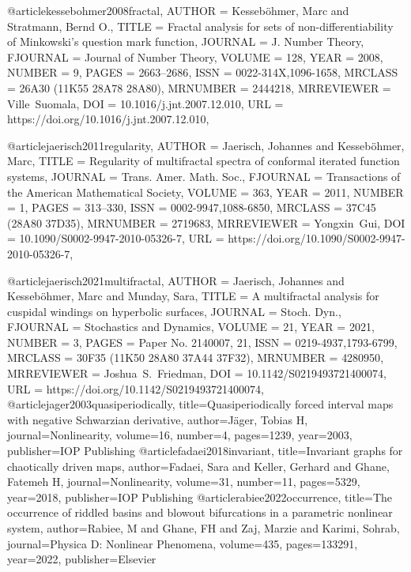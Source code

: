 @article{kessebohmer2008fractal,
    AUTHOR = {Kesseb\"ohmer, Marc and Stratmann, Bernd O.},
     TITLE = {Fractal analysis for sets of non-differentiability of
              {M}inkowski's question mark function},
   JOURNAL = {J. Number Theory},
  FJOURNAL = {Journal of Number Theory},
    VOLUME = {128},
      YEAR = {2008},
    NUMBER = {9},
     PAGES = {2663--2686},
      ISSN = {0022-314X,1096-1658},
   MRCLASS = {26A30 (11K55 28A78 28A80)},
  MRNUMBER = {2444218},
MRREVIEWER = {Ville\ Suomala},
       DOI = {10.1016/j.jnt.2007.12.010},
       URL = {https://doi.org/10.1016/j.jnt.2007.12.010},
}

@article{jaerisch2011regularity,
    AUTHOR = {Jaerisch, Johannes and Kesseb\"ohmer, Marc},
     TITLE = {Regularity of multifractal spectra of conformal iterated
              function systems},
   JOURNAL = {Trans. Amer. Math. Soc.},
  FJOURNAL = {Transactions of the American Mathematical Society},
    VOLUME = {363},
      YEAR = {2011},
    NUMBER = {1},
     PAGES = {313--330},
      ISSN = {0002-9947,1088-6850},
   MRCLASS = {37C45 (28A80 37D35)},
  MRNUMBER = {2719683},
MRREVIEWER = {Yongxin\ Gui},
       DOI = {10.1090/S0002-9947-2010-05326-7},
       URL = {https://doi.org/10.1090/S0002-9947-2010-05326-7},
}

@article{jaerisch2021multifractal,
    AUTHOR = {Jaerisch, Johannes and Kesseb\"ohmer, Marc and Munday, Sara},
     TITLE = {A multifractal analysis for cuspidal windings on hyperbolic
              surfaces},
   JOURNAL = {Stoch. Dyn.},
  FJOURNAL = {Stochastics and Dynamics},
    VOLUME = {21},
      YEAR = {2021},
    NUMBER = {3},
     PAGES = {Paper No. 2140007, 21},
      ISSN = {0219-4937,1793-6799},
   MRCLASS = {30F35 (11K50 28A80 37A44 37F32)},
  MRNUMBER = {4280950},
MRREVIEWER = {Joshua\ S.\ Friedman},
       DOI = {10.1142/S0219493721400074},
       URL = {https://doi.org/10.1142/S0219493721400074},
}
@article{jager2003quasiperiodically,
  title={Quasiperiodically forced interval maps with negative Schwarzian derivative},
  author={J{\"a}ger, Tobias H},
  journal={Nonlinearity},
  volume={16},
  number={4},
  pages={1239},
  year={2003},
  publisher={IOP Publishing}
}
@article{fadaei2018invariant,
  title={Invariant graphs for chaotically driven maps},
  author={Fadaei, Sara and Keller, Gerhard and Ghane, Fatemeh H},
  journal={Nonlinearity},
  volume={31},
  number={11},
  pages={5329},
  year={2018},
  publisher={IOP Publishing}
}
@article{rabiee2022occurrence,
  title={The occurrence of riddled basins and blowout bifurcations in a parametric nonlinear system},
  author={Rabiee, M and Ghane, FH and Zaj, Marzie and Karimi, Sohrab},
  journal={Physica D: Nonlinear Phenomena},
  volume={435},
  pages={133291},
  year={2022},
  publisher={Elsevier}
}


